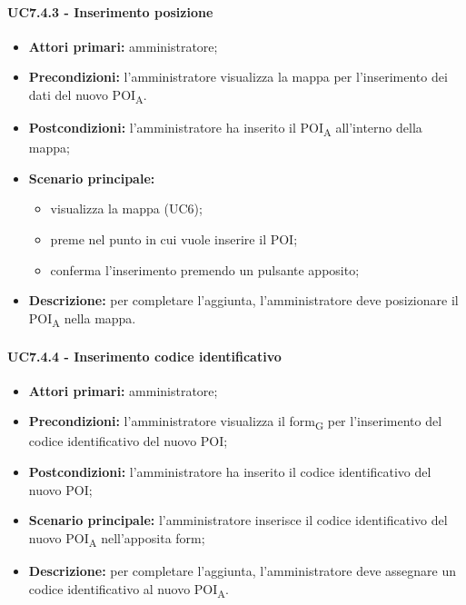 \paragraph{UC7.4.3 - Inserimento posizione}
\begin{itemize}
	\item 	\textbf{Attori primari:} amministratore;
	\item 	\textbf{Precondizioni:} l’amministratore visualizza la mappa per l’inserimento dei dati del nuovo \acrshort{POI}\textsubscript{A}.
	\item 	\textbf{Postcondizioni:} l’amministratore ha inserito il \acrshort{POI}\textsubscript{A} all’interno della mappa; 
	\item 	\textbf{Scenario principale:}
	\begin{itemize}
		\item visualizza la mappa (UC6);
		\item preme nel punto in cui vuole inserire il POI;
		\item conferma l’inserimento premendo un pulsante apposito;
	\end{itemize}
	\item 	\textbf{Descrizione:} per completare l’aggiunta, l’amministratore deve posizionare il \acrshort{POI}\textsubscript{A} nella mappa.

\end{itemize}

\paragraph{UC7.4.4 - Inserimento codice identificativo}
\begin{itemize}
	\item 	\textbf{Attori primari:} amministratore;
	\item 	\textbf{Precondizioni:} l’amministratore visualizza il \gls{form}\textsubscript{G} per l’inserimento del codice identificativo del nuovo POI;
	\item 	\textbf{Postcondizioni:} l’amministratore ha inserito il codice identificativo del nuovo POI; 
	\item 	\textbf{Scenario principale:} l’amministratore inserisce il codice identificativo del nuovo \acrshort{POI}\textsubscript{A} nell’apposita form;
	\item 	\textbf{Descrizione:} per completare l’aggiunta, l’amministratore deve assegnare un codice identificativo al nuovo \acrshort{POI}\textsubscript{A}.

\end{itemize}

